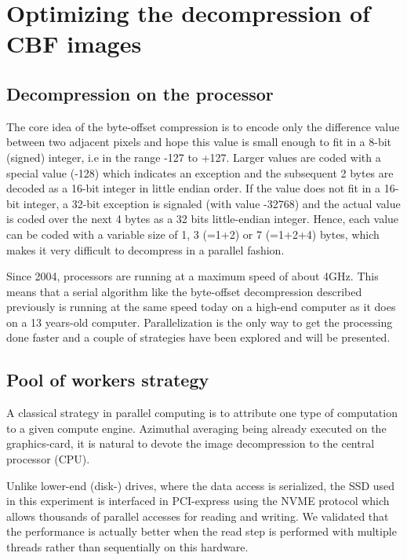 \documentclass[preprint]{iucr}              %
\begin{document}
\section{Optimizing the decompression of CBF images}

\subsection{Decompression on the processor}

The core idea of the byte-offset compression is to encode only the difference
value between two adjacent pixels and hope this value is small enough to fit in
a 8-bit (signed) integer, i.e in the range -127 to +127.
Larger values are coded with a special value (-128) which indicates an exception
and the subsequent 2 bytes are decoded as a 16-bit integer in little endian
order.
If the value does not fit in a 16-bit integer, a 32-bit exception is
signaled (with value -32768) and the actual value is coded over the next 4 bytes
as a 32 bits little-endian integer.
Hence, each value can be coded with a variable size of 1, 3 (=1+2) or 7 (=1+2+4)
bytes, which makes it very difficult to decompress in a parallel fashion.

Since 2004, processors are running at a maximum speed of about 4GHz.
This means that a serial algorithm like the byte-offset decompression described
previously is running at the same speed today on a high-end computer as it
does on a 13 years-old computer.
Parallelization is the only way to get the processing done faster and a couple
of strategies have been explored and will be presented.

\subsection{Pool of workers strategy} 

A classical strategy in parallel computing is to attribute one type of
computation to a given compute engine.
Azimuthal averaging being already executed on the graphics-card, it is natural
to devote the image decompression to the central processor (CPU).

Unlike lower-end (disk-) drives, where the data access is serialized,
the SSD used in this experiment is interfaced in PCI-express using the NVME
protocol \cite{nvme} which allows thousands of parallel accesses for reading and
writing.
We validated that the performance is actually better when the read step is
performed with multiple threads rather than sequentially on this hardware.
\end{document}
